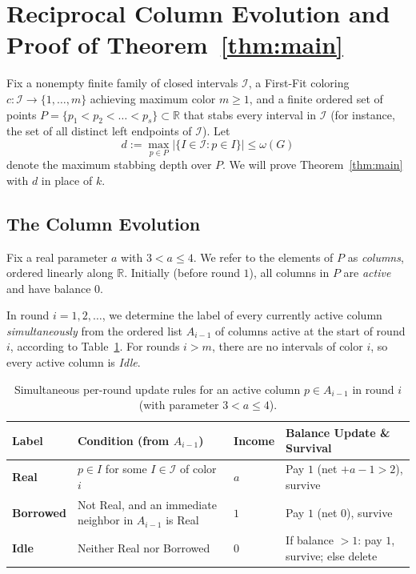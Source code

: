 \documentclass[11pt,a4paper]{article}
\theoremstyle{remark}
\begin{document}
\section{Reciprocal Column Evolution and Proof of Theorem~\ref{thm:main}}

Fix a nonempty finite family of closed intervals $\mathcal{I}$, a First-Fit coloring $c : \mathcal{I} \to \{1, \dots, m\}$ achieving maximum color $m \ge 1$, and a finite ordered set of points $P = \{p_1 < p_2 < \dots < p_s\} \subset \mathbb{R}$ that stabs every interval in $\mathcal{I}$ (for instance, the set of all distinct left endpoints of $\mathcal{I}$). Let
\[
  d := \max_{p \in P} \bigl|\{ I \in \mathcal{I} : p \in I \}\bigr| \le \omega(G)
\]
denote the maximum stabbing depth over $P$. We will prove Theorem~\ref{thm:main} with $d$ in place of $k$.

\subsection{The Column Evolution}

Fix a real parameter $a$ with $3 < a \le 4$. We refer to the elements of $P$ as \emph{columns}, ordered linearly along $\mathbb{R}$. Initially (before round $1$), all columns in $P$ are \emph{active} and have balance $0$.

In round $i = 1, 2, \dots$, we determine the label of every currently active column \emph{simultaneously} from the ordered list $A_{i-1}$ of columns active at the start of round $i$, according to Table~\ref{tab:rules}. For rounds $i > m$, there are no intervals of color $i$, so every active column is \emph{Idle}.

\begin{table}[!htbp]
\centering
\caption{Simultaneous per-round update rules for an active column $p \in A_{i-1}$ in round $i$ (with parameter $3 < a \le 4$).}
\label{tab:rules}
\begin{tabularx}{\linewidth}{l X l l}
\toprule
\textbf{Label} & \textbf{Condition (from $A_{i-1}$)} & \textbf{Income} & \textbf{Balance Update \& Survival} \\
\midrule
\textbf{Real} & $p \in I$ for some $I \in \mathcal{I}$ of color $i$ & $a$ & Pay $1$ (net $+a-1 > 2$), survive \\
\textbf{Borrowed} & Not Real, and an immediate neighbor in $A_{i-1}$ is Real & $1$ & Pay $1$ (net $0$), survive \\
\textbf{Idle} & Neither Real nor Borrowed & $0$ & If balance $> 1$: pay $1$, survive; else delete \\
\bottomrule
\end{tabularx}
\end{table}
\end{document}
